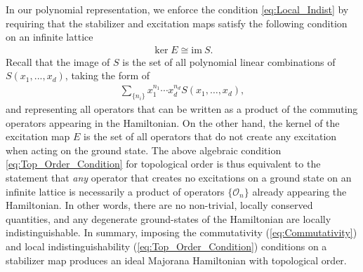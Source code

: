 \documentclass[aps,twocolumn,preprintnumbers,floatfix,showpacs,prx]{revtex4-1}
\begin{document}
In our polynomial representation, we enforce the condition \eqref{eq:Local_Indist}
by requiring that the stabilizer and excitation maps satisfy the following condition on an infinite lattice
\begin{align}\label{eq:Top_Order_Condition}
\ker E \cong \mathrm{im}~S.
\end{align}
Recall that the image of $S$ is the set of all polynomial linear combinations of $S(x_1, ..., x_d)$,
taking the form of 
\begin{align}
\sum_{\{ n_i \}} x_1^{n_1} \cdots x_d^{n_d} S( x_1, \ldots, x_d),  
\end{align}
and representing all operators that can be written as a product of the commuting operators appearing in the Hamiltonian.
On the other hand, the kernel of the excitation map $E$ is the set of all operators that do not create any excitation when acting on the ground state.  
The above algebraic condition \eqref{eq:Top_Order_Condition} for topological order is thus equivalent to the statement that  
\emph{any} operator that creates no excitations on a ground state on an infinite lattice 
is necessarily a product of operators $\{\mathcal{O}_{n}\}$ already appearing the Hamiltonian.
In other words, there are no %
non-trivial, locally conserved quantities,
and any degenerate ground-states of the Hamiltonian are locally indistinguishable. In summary, imposing the commutativity (\ref{eq:Commutativity})
and local indistinguishability (\ref{eq:Top_Order_Condition}) conditions on a stabilizer map produces an ideal Majorana Hamiltonian with topological order.
\end{document}
